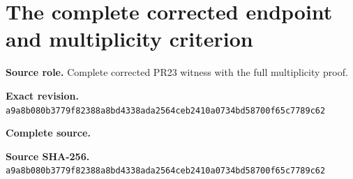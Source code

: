 \begingroup
\sloppy
\small
\clearpage
\section{The complete corrected endpoint and multiplicity criterion}
\noindent\textbf{Source role.} Complete corrected PR23 witness with the full multiplicity proof.\par
\noindent\textbf{Exact revision.} \nolinkurl{a9a8b080b3779f82388a8bd4338ada2564ceb2410a0734bd58700f65c7789c62}\par
\noindent\textbf{Complete source.} \par
\noindent\textbf{Source SHA-256.} \nolinkurl{a9a8b080b3779f82388a8bd4338ada2564ceb2410a0734bd58700f65c7789c62}\par\medskip

\endgroup
